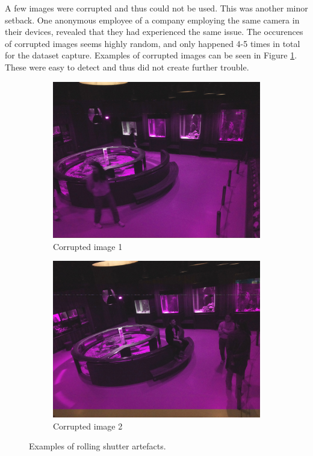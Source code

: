 A few images were corrupted and thus could not be used. This was another minor setback. One anonymous employee of a company employing the same camera in their devices, revealed that they had experienced the same issue. The occurences of corrupted images seems highly random, and only happened 4-5 times in total for the dataset capture. Examples of corrupted images can be seen in Figure \ref{fig:corrupted_images}. These were easy to detect and thus did not create further trouble.

\begin{figure}[H]
    \centering
    \begin{subfigure}{0.49\textwidth}
        \centering
        \includegraphics[width=\textwidth]{Images/DeviceImages/2nd-iteration/corrupted1.jpg}
        \caption{Corrupted image 1}
    \end{subfigure}
    \hfill
    \begin{subfigure}{0.49\textwidth}
        \centering
        \includegraphics[width=\textwidth]{Images/DeviceImages/2nd-iteration/corrupted2.jpg}
        \caption{Corrupted image 2}
    \end{subfigure}
    \caption{Examples of rolling shutter artefacts.}
    \label{fig:corrupted_images}
\end{figure}

